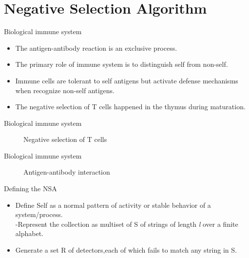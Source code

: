 \section{Negative Selection Algorithm}

\begin{frame}{Biological immune system}
  \begin{itemize}
  \item {
    The antigen-antibody reaction is an exclusive process.
  }
  \item {
    The primary role of immune system is to distinguish self from non-self.
  }
  \item {
    Immune cells are tolerant to self antigens but activate defense mechanisms when recognize non-self antigens.   
  }
  \item {
    The negative selection of T cells happened in the thymus during maturation.
  }
  \end{itemize}
\end{frame}

\begin{frame}{Biological immune system}
  \begin{figure}[hb]
  \centering
  \caption{Negative selection of T cells}
  \end{figure}
\end{frame}

\begin{frame}{Biological immune system}
  \begin{figure}[hb]
  \centering
  \caption{Antigen-antibody interaction}
  \end{figure}
\end{frame}

\begin{frame}{Defining the NSA}
  \begin{itemize}
  \item<1->{
    Define Self as a normal pattern of activity or stable behavior of a system/process.\\
    -Represent the collection as multiset of S of strings of length \emph{l} over a finite alphabet.
  }
  \item<2-> {   
    Generate a set R of detectors,each of which fails to match any string in S.
  }
  
  \end{itemize}
\end{frame}
 

